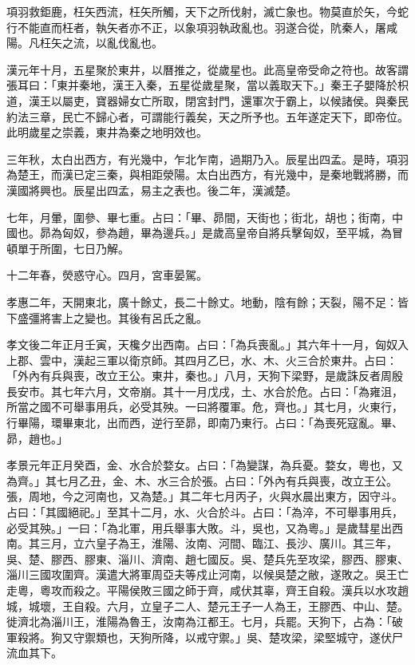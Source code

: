 \begin{pinyinscope}
項羽救鉅鹿，枉矢西流，枉矢所觸，天下之所伐射，滅亡象也。物莫直於矢，今蛇行不能直而枉者，執矢者亦不正，以象項羽執政亂也。羽遂合從，阬秦人，屠咸陽。凡枉矢之流，以亂伐亂也。

漢元年十月，五星聚於東井，以曆推之，從歲星也。此高皇帝受命之符也。故客謂張耳曰：「東并秦地，漢王入秦，五星從歲星聚，當以義取天下。」秦王子嬰降於枳道，漢王以屬吏，寶器婦女亡所取，閉宮封門，還軍次于霸上，以候諸侯。與秦民約法三章，民亡不歸心者，可謂能行義矣，天之所予也。五年遂定天下，即帝位。此明歲星之崇義，東井為秦之地明效也。

三年秋，太白出西方，有光幾中，乍北乍南，過期乃入。辰星出四孟。是時，項羽為楚王，而漢已定三秦，與相距滎陽。太白出西方，有光幾中，是秦地戰將勝，而漢國將興也。辰星出四孟，易主之表也。後二年，漢滅楚。

七年，月暈，圍參、畢七重。占曰：「畢、昴間，天街也；街北，胡也；街南，中國也。昴為匈奴，參為趙，畢為邊兵。」是歲高皇帝自將兵擊匈奴，至平城，為冒頓單于所圍，七日乃解。

十二年春，熒惑守心。四月，宮車晏駕。

孝惠二年，天開東北，廣十餘丈，長二十餘丈。地動，陰有餘；天裂，陽不足：皆下盛彊將害上之變也。其後有呂氏之亂。

孝文後二年正月壬寅，天欃夕出西南。占曰：「為兵喪亂。」其六年十一月，匈奴入上郡、雲中，漢起三軍以衛京師。其四月乙巳，水、木、火三合於東井。占曰：「外內有兵與喪，改立王公。東井，秦也。」八月，天狗下梁野，是歲誅反者周殷長安市。其七年六月，文帝崩。其十一月戊戌，土、水合於危。占曰：「為雍沮，所當之國不可舉事用兵，必受其殃。一曰將覆軍。危，齊也。」其七月，火東行，行畢陽，環畢東北，出而西，逆行至昴，即南乃東行。占曰：「為喪死寇亂。畢、昴，趙也。」

孝景元年正月癸酉，金、水合於婺女。占曰：「為變謀，為兵憂。婺女，粵也，又為齊。」其七月乙丑，金、木、水三合於張。占曰：「外內有兵與喪，改立王公。張，周地，今之河南也，又為楚。」其二年七月丙子，火與水晨出東方，因守斗。占曰：「其國絕祀。」至其十二月，水、火合於斗。占曰：「為淬，不可舉事用兵，必受其殃。」一曰：「為北軍，用兵舉事大敗。斗，吳也，又為粵。」是歲彗星出西南。其三月，立六皇子為王，淮陽、汝南、河間、臨江、長沙、廣川。其三年，吳、楚、膠西、膠東、淄川、濟南、趙七國反。吳、楚兵先至攻梁，膠西、膠東、淄川三國攻圍齊。漢遣大將軍周亞夫等戍止河南，以候吳楚之敝，遂敗之。吳王亡走粵，粵攻而殺之。平陽侯敗三國之師于齊，咸伏其辜，齊王自殺。漢兵以水攻趙城，城壞，王自殺。六月，立皇子二人、楚元王子一人為王，王膠西、中山、楚。徙濟北為淄川王，淮陽為魯王，汝南為江都王。七月，兵罷。天狗下，占為：「破軍殺將。狗又守禦類也，天狗所降，以戒守禦。」吳、楚攻梁，梁堅城守，遂伏尸流血其下。


\end{pinyinscope}
